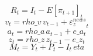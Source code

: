 \begin{dmath}
{R_{t}}={I_{t}}-{{E[\pi_{t+1}]}_{t}}
\end{dmath}
\begin{dmath}
{v_{t}}={rho\_v}\, {v_{t-1}}+{{\varepsilon_z^{news}}_{t}}
\end{dmath}
\begin{dmath}
{a_{t}}={rho\_a}\, {a_{t-1}}+{e\_a_{t}}
\end{dmath}
\begin{dmath}
{z_{t}}={rho\_z}\, {z_{t-1}}-{e\_z_{t}}
\end{dmath}
\begin{dmath}
{M_{t}}={Y_{t}}+{P_{t}}-{I_{t}}\, {eta}
\end{dmath}
